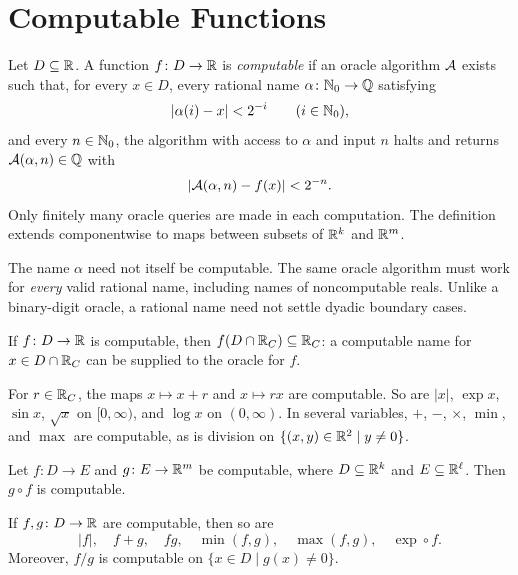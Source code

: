 \section{Computable Functions}

\begin{definition}
Let $D\subseteq\mathbb{R}$. A function $f\colon D\to\mathbb{R}$ is
\emph{computable} if an oracle algorithm $\mathcal{A}$ exists such that,
for every $x\in D$, every rational name
$\alpha\colon\mathbb{N}_0\to\mathbb{Q}$ satisfying
\[
 |\alpha(i)-x|<2^{-i}\qquad(i\in\mathbb{N}_0),
\]
and every $n\in\mathbb{N}_0$, the algorithm with access to $\alpha$ and
input $n$ halts and returns $\mathcal{A}(\alpha, n)\in\mathbb{Q}$ with
\[
 |\mathcal{A}(\alpha, n)-f(x)|<2^{-n}.
\]
Only finitely many oracle queries are made in each computation.
The definition extends componentwise to maps between subsets of
$\mathbb{R}^k$ and $\mathbb{R}^m$.
\end{definition}

\begin{remark}
The name $\alpha$ need not itself be computable. The same oracle
algorithm must work for \emph{every} valid rational name, including
names of noncomputable reals. Unlike a binary-digit oracle, a rational
name need not settle dyadic boundary cases.
\end{remark}

If $f\colon D\to\mathbb{R}$ is computable, then
$f(D\cap\mathbb{R}_C)\subseteq\mathbb{R}_C$: a computable name for $x\in D\cap\mathbb{R}_C$
can be supplied to the oracle for $f$.

\begin{example}
For $r\in\mathbb{R}_C$, the maps $x\mapsto x+r$ and $x\mapsto rx$ are
computable. So are $|x|$, $\exp x$, $\sin x$, $\sqrt{x}$ on
$[0, \infty)$, and $\log x$ on $(0, \infty)$.
In several variables, $+$, $-$, $\times$, $\min$, and $\max$ are
computable, as is division on $\{(x, y)\in\mathbb{R}^2\mid y\ne0\}$.
\end{example}

\begin{theorem}
Let $f\colon D\to E$ and $g\colon E\to\mathbb{R}^m$ be computable,
where $D\subseteq\mathbb{R}^k$ and $E\subseteq\mathbb{R}^\ell$.
Then $g\circ f$ is computable.
\end{theorem}

\begin{corollary}
If $f, g\colon D\to\mathbb{R}$ are computable, then so are
\[
 |f|, \quad f+g, \quad fg, \quad \min(f, g), \quad\max(f, g),
 \quad\exp\circ f.
\]
Moreover, $f/g$ is computable on $\{x\in D\mid g(x)\ne0\}$.
\end{corollary}

